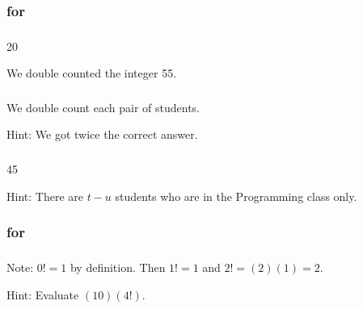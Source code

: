 
\subsubsection{\answers for 
 \subcountingawry}

\subsubsection*{ \answers}
    \begin{apart}
        \item 20
        \item We double counted the integer 55.
    \end{apart}
    
\subsubsection*{ \answers}
    \begin{apart}
        \item We double count each pair of students.
        \item Hint: We got twice the correct answer.
    \end{apart}
    
\subsubsection*{ \answers}
    \begin{apart}
        \item 45
        \item Hint: There are $t-u$ students who are in the Programming class only.
    \end{apart}


\subsubsection{\answers for 
     \subfactorials}
   
\subsubsection*{ \answers}
    \begin{apart}
        \item Note: $0!=1$ by definition.  Then $1! =1$ and $2! = (2)(1) = 2$.
        \item Hint: Evaluate $(10)(4!)$.
    \end{apart}
    
